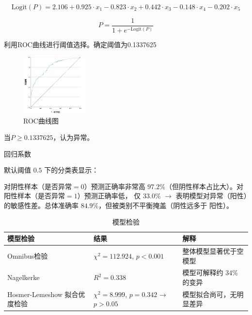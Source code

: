 \documentclass[withoutpreface,notoc]{cumcmthesis}
\begin{document}
	\begin{equation*}
	\label{logit}
	\text{Logit}(P) = 2.106 + 0.925 \cdot x_{1} - 0.823 \cdot x_{2} + 0.442 \cdot x_{3} - 0.148 \cdot x_{4} - 0.202 \cdot x_{5}
	\end{equation*}

	\begin{equation*}
	P = \frac{1}{1 + e^{-\mathrm{Logit}(P)}}
	\end{equation*}


	利用ROC曲线进行阈值选择。确定阈值为0.1337625
	\begin{figure}[ht]
		\centering
		\includegraphics[width=0.3\textwidth]{figures/ROC曲线.png} 
		\caption{ROC曲线图}
		\label{ROC曲线}
	\end{figure}

	当$P\geq0.1337625 $，认为异常。


	回归系数


	默认阈值 $0.5$ 下的分类表显示：

	对阴性样本（是否异常$=0$）预测正确率非常高 $97.2\%$（但阴性样本占比大）。对阳性样本（是否异常$=1$）预测正确率低，
	仅 $33.0\%$ $\rightarrow$ 表明模型对异常（阳性）的敏感性差。总体准确率 $84.9\%$，但被类别不平衡掩盖（阴性远多于
	阳性）。

	

	\begin{table}[!ht]
		\centering
		\caption{模型检验}
		\label{模型检验}
		\begin{tabular}{|l|l|l|}
		\hline
			模型检验 & 结果 & 解释 \\ \hline
			Omnibus检验 & $\chi^2 = 112.924$, $p < 0.001$ & 整体模型显著优于空模型 \\ \hline
			Nagelkerke & $R^2 = 0.338$ & 模型可解释约 34\% 的变异 \\ \hline
			Hosmer-Lemeshow 拟合优度检验 & $\chi^2 = 8.999$, $p = 0.342$ → $p > 0.05$ & 模型拟合尚可，无明显差异\\ \hline
		\end{tabular}
	\end{table}
\end{document}
